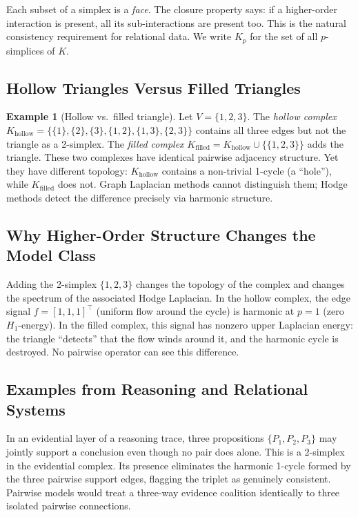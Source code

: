 \documentclass[11pt]{article}
\theoremstyle{definition}
\newtheorem{example}[theorem]{Example}
\theoremstyle{remark}
\begin{document}
Each subset of a simplex is a \emph{face}. The closure property says: if a
higher-order interaction is present, all its sub-interactions are present too.
This is the natural consistency requirement for relational data. We write
$K_p$ for the set of all $p$-simplices of $K$.

\subsection{Hollow Triangles Versus Filled Triangles}

\begin{example}[Hollow vs.\ filled triangle]
\label{ex:hollow}
Let $V=\{1,2,3\}$. The \emph{hollow complex}
$K_{\mathrm{hollow}} = \{\{1\},\{2\},\{3\},\{1,2\},\{1,3\},\{2,3\}\}$ contains
all three edges but not the triangle as a 2-simplex. The \emph{filled complex}
$K_{\mathrm{filled}} = K_{\mathrm{hollow}} \cup \{\{1,2,3\}\}$ adds the triangle.
These two complexes have identical pairwise adjacency structure. Yet they have
different topology: $K_{\mathrm{hollow}}$ contains a non-trivial 1-cycle (a
``hole''), while $K_{\mathrm{filled}}$ does not. Graph Laplacian methods cannot
distinguish them; Hodge methods detect the difference precisely via harmonic
structure.
\end{example}

\subsection{Why Higher-Order Structure Changes the Model Class}

Adding the 2-simplex $\{1,2,3\}$ changes the topology of the complex and
changes the spectrum of the associated Hodge Laplacian. In the hollow complex,
the edge signal $f=[1,1,1]^\top$ (uniform flow around the cycle) is harmonic
at $p=1$ (zero $H_1$-energy). In the filled complex, this signal has nonzero
upper Laplacian energy: the triangle ``detects'' that the flow winds around it,
and the harmonic cycle is destroyed. No pairwise operator can see this
difference.

\subsection{Examples from Reasoning and Relational Systems}

In an evidential layer of a reasoning trace, three propositions
$\{P_1, P_2, P_3\}$ may jointly support a conclusion even though no pair does
alone. This is a 2-simplex in the evidential complex. Its presence eliminates
the harmonic 1-cycle formed by the three pairwise support edges, flagging the
triplet as genuinely consistent. Pairwise models would treat a three-way
evidence coalition identically to three isolated pairwise connections.
\end{document}
